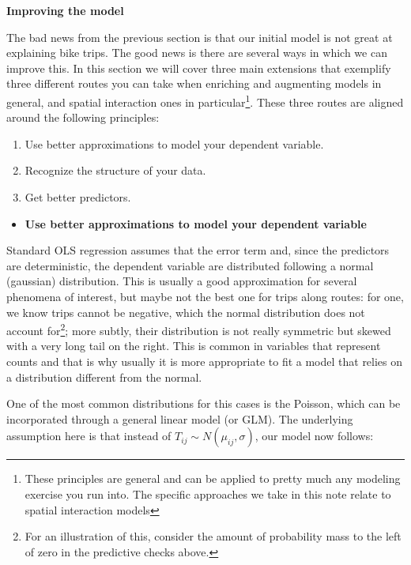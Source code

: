 \documentclass[
  letterpaper,
  krantz2]{style/krantz}
\providecommand{\tightlist}{%
  \setlength{\itemsep}{0pt}\setlength{\parskip}{0pt}}\usepackage{longtable,booktabs,array}
\begin{document}
\textbf{Improving the model}

The bad news from the previous section is that our initial model is not
great at explaining bike trips. The good news is there are several ways
in which we can improve this. In this section we will cover three main
extensions that exemplify three different routes you can take when
enriching and augmenting models in general, and spatial interaction ones
in particular\footnote{These principles are general and can be applied
  to pretty much any modeling exercise you run into. The specific
  approaches we take in this note relate to spatial interaction models}.
These three routes are aligned around the following principles:

\begin{enumerate}
\def\labelenumi{\arabic{enumi}.}
\tightlist
\item
  Use better approximations to model your dependent variable.
\item
  Recognize the structure of your data.
\item
  Get better predictors.
\end{enumerate}

\begin{itemize}
\tightlist
\item
  \textbf{Use better approximations to model your dependent variable}
\end{itemize}

Standard OLS regression assumes that the error term and, since the
predictors are deterministic, the dependent variable are distributed
following a normal (gaussian) distribution. This is usually a good
approximation for several phenomena of interest, but maybe not the best
one for trips along routes: for one, we know trips cannot be negative,
which the normal distribution does not account for\footnote{For an
  illustration of this, consider the amount of probability mass to the
  left of zero in the predictive checks above.}; more subtly, their
distribution is not really symmetric but skewed with a very long tail on
the right. This is common in variables that represent counts and that is
why usually it is more appropriate to fit a model that relies on a
distribution different from the normal.

One of the most common distributions for this cases is the Poisson,
which can be incorporated through a general linear model (or GLM). The
underlying assumption here is that instead of
\(T_{ij} \sim N(\mu_{ij}, \sigma)\), our model now follows:
\end{document}
